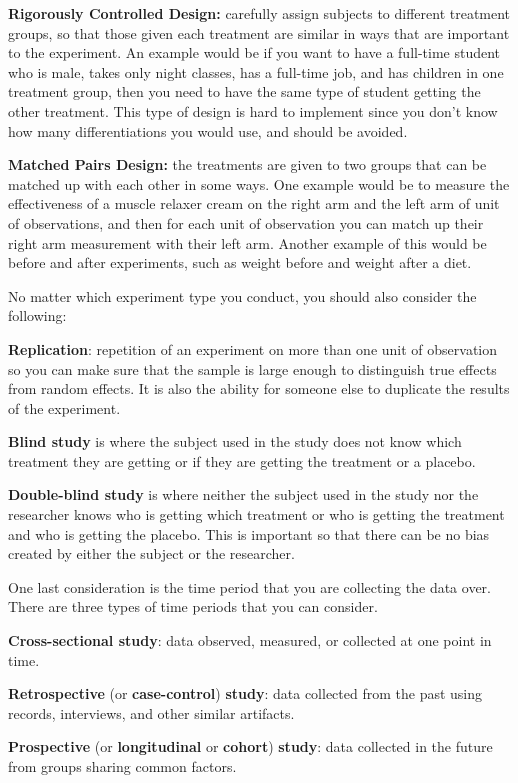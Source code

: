 \documentclass[
]{book}
\begin{document}
\textbf{Rigorously Controlled Design:} carefully assign subjects to different treatment groups, so that those given each treatment are similar in ways that are important to the experiment. An example would be if you want to have a full-time student who is male, takes only night classes, has a full-time job, and has children in one treatment group, then you need to have the same type of student getting the other treatment. This type of design is hard to implement since you don't know how many differentiations you would use, and should be avoided.

\textbf{Matched Pairs Design:} the treatments are given to two groups that can be matched up with each other in some ways. One example would be to measure the effectiveness of a muscle relaxer cream on the right arm and the left arm of unit of observations, and then for each unit of observation you can match up their right arm measurement with their left arm. Another example of this would be before and after experiments, such as weight before and weight after a diet.

No matter which experiment type you conduct, you should also consider the following:

\textbf{Replication}: repetition of an experiment on more than one unit of observation so you can make sure that the sample is large enough to distinguish true effects from random effects. It is also the ability for someone else to duplicate the results of the experiment.

\textbf{Blind study} is where the subject used in the study does not know which treatment they are getting or if they are getting the treatment or a placebo.

\textbf{Double-blind study} is where neither the subject used in the study nor the researcher knows who is getting which treatment or who is getting the treatment and who is getting the placebo. This is important so that there can be no bias created by either the subject or the researcher.

One last consideration is the time period that you are collecting the data over. There are three types of time periods that you can consider.

\textbf{Cross-sectional study}: data observed, measured, or collected at one point in time.

\textbf{Retrospective} (or \textbf{case-control}) \textbf{study}: data collected from the past using records, interviews, and other similar artifacts.

\textbf{Prospective} (or \textbf{longitudinal} or \textbf{cohort}) \textbf{study}: data collected in the future from groups sharing common factors.
\end{document}

